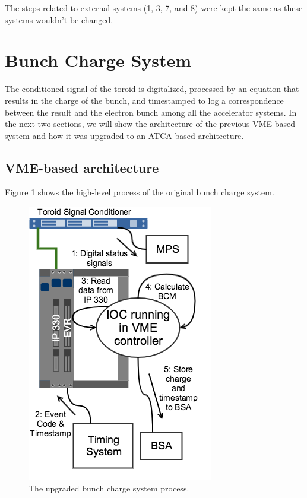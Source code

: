 \documentclass[letter,
        biblatex,   %
        keeplastbox,  %
        ]{jacow}
\begin{document}
The steps related to external systems (1, 3, 7, and 8) were kept the same as these systems wouldn't be changed.

\section{Bunch Charge System}
The conditioned signal of the toroid is digitalized, processed by an equation that results in the charge of the bunch, and timestamped to log a correspondence between the result and the electron bunch among all the accelerator systems. In the next two sections, we will show the architecture of the previous VME-based system and how it was upgraded to an ATCA-based architecture.

\subsection{VME-based architecture}
Figure \ref{fig:bcm_vme} shows the high-level process of the original bunch charge system.

\begin{figure}[!htb]
  \centering
  \includegraphics*[width=.8\columnwidth]{BCM_VME_Process}
  \caption{The upgraded bunch charge system process.}
  \label{fig:bcm_vme}
\end{figure}
\end{document}
